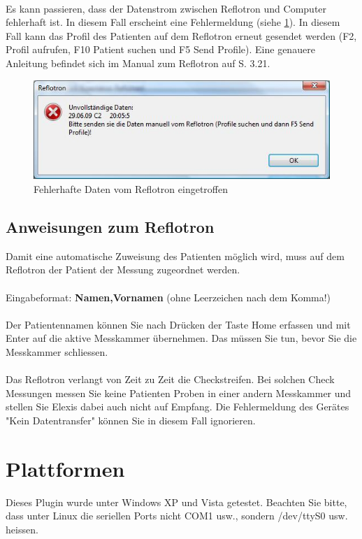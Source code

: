 \documentclass[a4paper]{scrartcl}
\begin{document}
\\
Es kann passieren, dass der Datenstrom zwischen Reflotron und Computer fehlerhaft ist. In diesem Fall erscheint eine Fehlermeldung (siehe \ref{fig:transmissionerror}). In diesem Fall kann das Profil des Patienten auf dem Reflotron erneut gesendet werden (F2, Profil aufrufen, F10 Patient suchen und F5 Send Profile). Eine genauere Anleitung befindet sich im Manual zum Reflotron auf S. 3.21.
\begin{figure}[h]
    \includegraphics{transmissionerror}
    \caption{Fehlerhafte Daten vom Reflotron eingetroffen}
    \label{fig:transmissionerror}
\end{figure}
\subsection{Anweisungen zum Reflotron}
Damit eine automatische Zuweisung des Patienten m\"oglich wird, muss auf dem Reflotron der Patient der Messung zugeordnet werden.\\
\\
Eingabeformat: \textbf{Namen,Vornamen} (ohne Leerzeichen nach dem Komma!)\\
\\
Der Patientennamen k\"onnen Sie nach Dr\"ucken der Taste Home erfassen und mit Enter auf die aktive Messkammer \"ubernehmen. Das m\"ussen Sie tun, bevor Sie die Messkammer schliessen.\\
\\
Das Reflotron verlangt von Zeit zu Zeit die Checkstreifen. Bei solchen Check Messungen messen Sie keine Patienten Proben in einer andern Messkammer und stellen Sie Elexis dabei auch nicht auf Empfang. Die Fehlermeldung des Ger\"ates "Kein Datentransfer"  k\"onnen Sie in diesem Fall ignorieren.

\section{Plattformen}
Dieses Plugin wurde unter Windows XP und Vista getestet. Beachten Sie bitte, dass unter Linux die seriellen Ports nicht COM1 usw., sondern /dev/ttyS0 usw. heissen.
\end{document}
